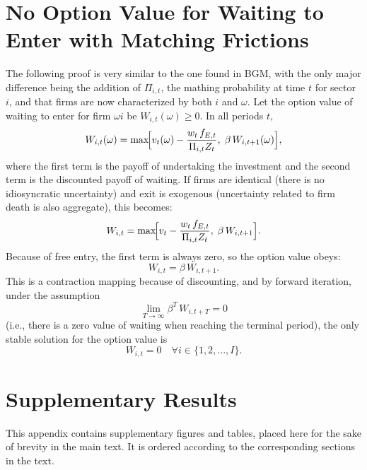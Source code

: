 \documentclass[a4paper,12pt]{article} %
\numberwithin{equation}{section} %
\numberwithin{figure}{section}
\numberwithin{table}{section}
\begin{document}
\begin{refsection}
\begin{appendices}
\pagebreak
\section{No Option Value for Waiting to Enter with Matching Frictions}
\label{sec-app:option}

The following proof is very similar to the one found in BGM, with the only major difference being the addition of $\Pi_{i,t}$,
the mathing probability at time $t$ for sector $i$, and that firms are now characterized by both $i$ and $\omega$.
Let the option value of waiting to enter for firm $\omega i$ be $W_{i,t}(\omega)\ge0$. In all periods $t$,
\[
W_{i,t}(\omega)
=\max\!\Bigl[v_t(\omega)-\frac{w_t\,f_{E,t}}{\Pi_{i,t}Z_t},\;\beta\,W_{i,t+1}(\omega)\Bigr],
\]
where the first term is the payoff of undertaking the investment and the second term is the discounted payoff of waiting. 
If firms are identical (there is no idiosyncratic uncertainty) and exit is exogenous (uncertainty related to firm death is also aggregate), this becomes:
\[
W_{i,t}
=\max\!\Bigl[v_t-\frac{w_t\,f_{E,t}}{\Pi_{i,t}Z_t},\;\beta\,W_{i,t+1}\Bigr].
\]
Because of free entry, the first term is always zero, so the option value obeys:
\[
W_{i,t} = \beta\,W_{i,t+1}.
\]
This is a contraction mapping because of discounting, and by forward iteration, under the assumption
\[
\lim_{T\to\infty}\beta^T\,W_{i,t+T}=0
\]
(i.e., there is a zero value of waiting when reaching the terminal period), the only stable solution for the option value is
\[
W_{i,t} = 0 \quad \forall i \in \{1,2,...,I\}.
\]

\pagebreak
\section{Supplementary Results}
\label{sec-app:sup}

This appendix contains supplementary figures and tables, placed here for the sake of brevity in the main text. It is ordered according to the corresponding sections in the text.


\end{appendices}
\end{refsection}
\end{document}
